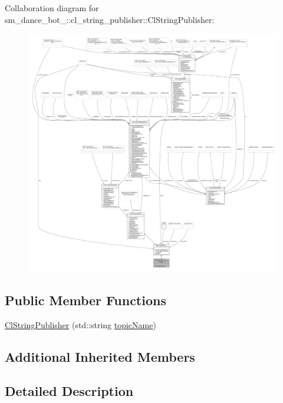 Collaboration diagram for sm\+\_\+dance\+\_\+bot\+\_\+:\+:cl\+\_\+string\+\_\+publisher\+:\+:Cl\+String\+Publisher\+:
\nopagebreak
\begin{figure}[H]
\begin{center}
\leavevmode
\includegraphics[width=350pt]{classsm__dance__bot__2_1_1cl__string__publisher_1_1ClStringPublisher__coll__graph}
\end{center}
\end{figure}
\subsection*{Public Member Functions}
\begin{DoxyCompactItemize}
\item 
\hyperlink{classsm__dance__bot__2_1_1cl__string__publisher_1_1ClStringPublisher_ab946a48d8c6ba33ce49623d75268d775}{Cl\+String\+Publisher} (std\+::string \hyperlink{classsmacc_1_1client__bases_1_1SmaccPublisherClient_a8b8d98aef9b3b3a441005d2cb17b4fcc}{topic\+Name})
\end{DoxyCompactItemize}
\subsection*{Additional Inherited Members}


\subsection{Detailed Description}


